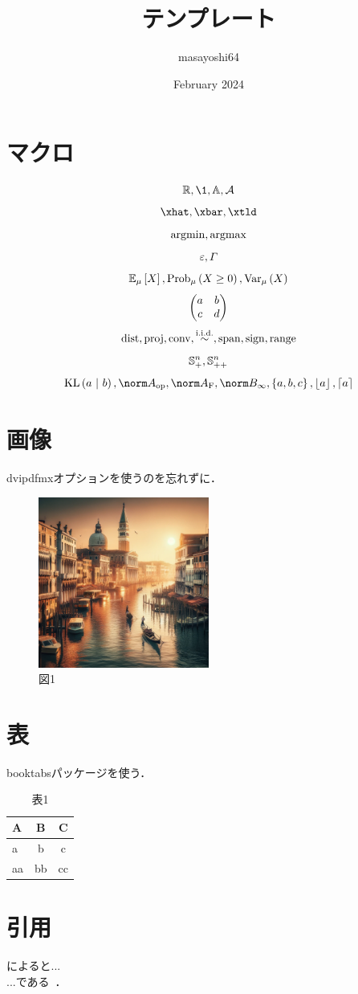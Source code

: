 \documentclass[11pt,a4paper, dvipdfmx]{article}
\title{テンプレート}
\author{masayoshi64}
\date{February 2024}
\begin{document}
\maketitle

\section{マクロ}
\[\R, \1, \Abb, \cA\]
\[\xhat, \xbar, \xtld\]
\[\operatorname*{argmin}, \operatorname*{argmax}\]
\[\varepsilon, \varGamma\]
\[\Expec[\mu]{X}, \Prob[\mu]{X \geq 0}, \Var[\mu]{X}\]
\[\begin{pmatrix} 
        a & b                \\
        c & d
     \end{pmatrix}\]
\[\mathrm{dist}, \mathrm{proj}, \mathrm{conv}, \overset{\mathrm{i.i.d.}}{\sim}, \mathrm{span}, \mathrm{sign}, \mathrm{range} \]
\[\mathbb{S}^{n}_+, \mathbb{S}^{n}_{++}\]
\[\kl{a}{b}, \opnorm{A}, \frobnorm{A}, \infnorm{B}, \set{a, b, c}, \floor{a}, \ceil{a}\]

\section{画像}
dvipdfmxオプションを使うのを忘れずに．
\begin{figure}[htbp]
    \centering
    \includegraphics[width=0.5\textwidth]{figs/test.png}
    \caption{図1}
    \label{fig:fig1}
\end{figure}

\section{表}
booktabsパッケージを使う．
\begin{table}[h]
    \caption{表1}
    \label{table:table1}
    \centering
    \begin{tabular}{lcc}
        \toprule
        A  & B  & C  \\
        \midrule
        a  & b  & c  \\
        aa & bb & cc \\
        \bottomrule
    \end{tabular}
\end{table}

\section{引用}
\cite{jacot2018neural}によると...\\
...である~\cite{rafailov2023direct}．



\end{document}
